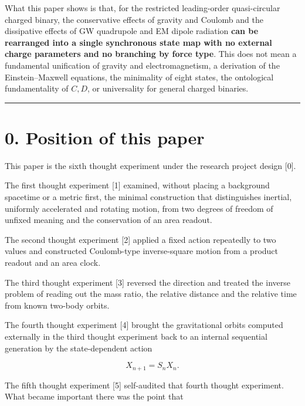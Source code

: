 \documentclass[
  a4paper,
]{article}
\begin{document}
What this paper shows is that, for the restricted leading-order
quasi-circular charged binary, the conservative effects of gravity and
Coulomb and the dissipative effects of GW quadrupole and EM dipole
radiation \textbf{can be rearranged into a single synchronous state map
with no external charge parameters and no branching by force type}. This
does not mean a fundamental unification of gravity and electromagnetism,
a derivation of the Einstein--Maxwell equations, the minimality of eight
states, the ontological fundamentality of \(C,D\), or universality for
general charged binaries.

\begin{center}\rule{0.5\linewidth}{0.5pt}\end{center}

\section{0. Position of this paper}\label{position-of-this-paper}

This paper is the sixth thought experiment under the research project
design {[}0{]}.

The first thought experiment {[}1{]} examined, without placing a
background spacetime or a metric first, the minimal construction that
distinguishes inertial, uniformly accelerated and rotating motion, from
two degrees of freedom of unfixed meaning and the conservation of an
area readout.

The second thought experiment {[}2{]} applied a fixed action repeatedly
to two values and constructed Coulomb-type inverse-square motion from a
product readout and an area clock.

The third thought experiment {[}3{]} reversed the direction and treated
the inverse problem of reading out the mass ratio, the relative distance
and the relative time from known two-body orbits.

The fourth thought experiment {[}4{]} brought the gravitational orbits
computed externally in the third thought experiment back to an internal
sequential generation by the state-dependent action

\[
X_{n+1}=S_nX_n.
\]

The fifth thought experiment {[}5{]} self-audited that fourth thought
experiment. What became important there was the point that

\begin{center}
\end{center}
\end{document}
